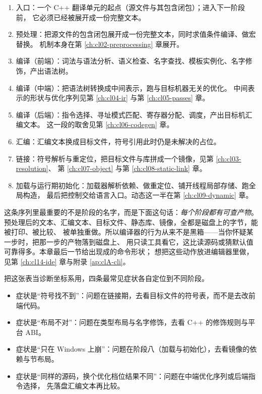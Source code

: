\documentclass[12pt,a4paper,fontset=fandol]{ctexbook}
\newcommand{\Lang}[1]{\textsf{#1}}
\newcommand{\CPP}{\Lang{C++}}
\newcommand{\Win}{\textsf{Windows}}
\begin{document}
\begin{flow}[title={从源文件到可执行镜像的阶段序列}]
\begin{enumerate}[leftmargin=2.2em]
  \item 入口：一个 \CPP{} 翻译单元的起点（源文件与其包含闭包）；进入下一阶段前，
    它必须已经被展开成一份完整文本。
  \item 预处理：把源文件的包含闭包展开成一份完整文本，同时求值条件编译、做宏替换。
    机制本身在第 \ref{ch:cl02-preprocessing} 章展开。
  \item 编译（前端）：词法与语法分析、语义检查、名字查找、模板实例化、名字修饰，产出语法树。
  \item 编译（中端）：把语法树转换成中间表示，跑与目标机器无关的优化。
    中间表示的形状与优化序列见第 \ref{ch:cl04-ir} 与第 \ref{ch:cl05-passes} 章。
  \item 编译（后端）：指令选择、寻址模式匹配、寄存器分配、调度，产出目标机汇编文本。
    这一段的取舍见第 \ref{ch:cl06-codegen} 章。
  \item 汇编：汇编文本换成目标文件，符号引用此时仍是未解决的占位。
  \item 链接：符号解析与重定位，把目标文件与库拼成一个镜像，见第 \ref{ch:cl03-resolution}、
    第 \ref{ch:cl07-object} 与第 \ref{ch:cl08-static-link} 章。
  \item 加载与运行期初始化：加载器解析依赖、做重定位、铺开线程局部存储、跑全局构造，
    最后把控制交给语言入口。动态这一半在第 \ref{ch:cl09-dynamic} 章。
\end{enumerate}
\end{flow}

这条序列里最重要的不是阶段的名字，而是下面这句话：\emph{每个阶段都有可查产物}。
预处理后的文本、汇编文本、目标文件、静态库、镜像，全都是磁盘上的字节，能被打印、被比较、
被单独重做。所以编译器的行为从来不是黑箱——当你怀疑某一步时，把那一步的产物落到磁盘上、
用只读工具看它，这比读源码或猜默认值可靠得多。本章最后一节给出现成的命令形状；
想把这些动作放进编辑器里做，见第 \ref{ch:cl14-ide} 章与附录 \ref{ap:clA-cli}。

把这张表当诊断坐标系用，四条最常见症状各自定位到不同阶段。
\begin{itemize}
  \item 症状是“符号找不到”：问题在链接期，去看目标文件的符号表，而不是去改前端代码。
  \item 症状是“布局不对”：问题在类型布局与名字修饰，去看 \CPP{} 的修饰规则与平台 ABI。
  \item 症状是“只在 \Win{} 上崩”：问题在阶段八（加载与初始化），去看镜像的依赖与节布局。
  \item 症状是“同样的源码，换个优化档位结果不同”：问题在中端优化序列或后端指令选择，
    先落盘汇编文本再比较。
\end{itemize}
\end{document}
